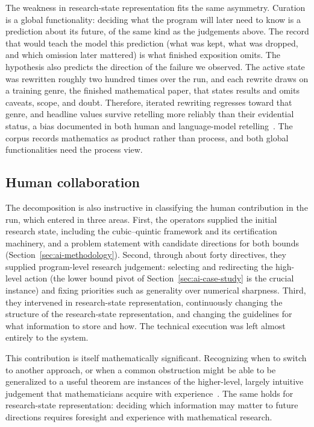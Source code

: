 The weakness in research-state representation fits the same asymmetry.
Curation is a global functionality: deciding what the program will later need to
know is a prediction about its future, of the same kind as the judgements
above. The record that would teach the model this prediction (what was kept, what was dropped,
and which omission later mattered) is what finished exposition
omits. The hypothesis also predicts the direction of the failure we
observed. The active state was rewritten roughly two hundred times over the
run, and each rewrite draws on a training genre, the finished mathematical paper, that
states results and omits caveats, scope, and doubt. Therefore, iterated rewriting regresses toward that genre, and headline values survive retelling
more reliably than their evidential status, a bias documented in both human
and language-model
retelling~\cite{bartlett1932remembering,acerbi2023transmission,mohamed2025broken}.
The corpus records mathematics as product rather than process, and both
global functionalities need the process view.


\subsection{Human collaboration}

The decomposition is also instructive in classifying the human contribution in the run, which entered in three areas. First, the operators supplied the initial
research state, including the cubic--quintic framework and its certification
machinery, and a problem statement with candidate directions for both
bounds (Section~\ref{sec:ai-methodology}). Second, through about forty directives, they supplied
program-level research judgement: selecting and redirecting the
high-level action (the lower bound pivot of Section~\ref{sec:ai-case-study} is the
crucial instance) and fixing priorities such as generality over
numerical sharpness. Third, they
intervened in research-state representation, continuously changing the structure of the research-state representation, and changing the guidelines for what information to store and how. The technical execution was left almost entirely
to the system.

This contribution is itself mathematically significant. Recognizing when to switch to another approach, or when a common obstruction might be able to be generalized to a useful theorem are instances of the higher-level, largely intuitive
judgement that mathematicians acquire with
experience~\cite{tao2007good,thurston1994proof}.
The same holds for research-state representation: deciding which information may matter to future directions requires foresight and experience with mathematical research.


